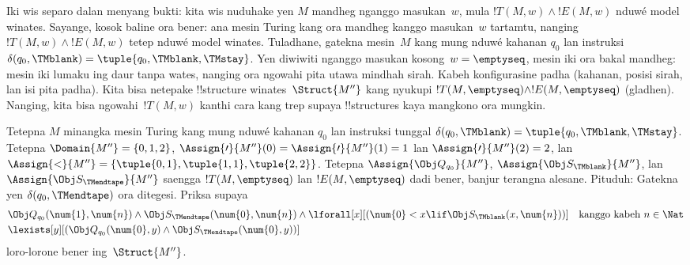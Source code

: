 \documentclass[../../../include/open-logic-section]{subfiles}
\begin{document}
\begin{explain}
  Iki wis separo dalan menyang bukti: kita wis
  nuduhake yen $M$ mandheg nganggo masukan~$w$,
  mula $!T(M,w) \land !E(M,w)$ nduwé model winates.
  Sayange, kosok baline ora bener: ana mesin Turing
  kang ora mandheg kanggo masukan~$w$ tartamtu,
  nanging $!T(M,w) \land !E(M,w)$ tetep nduwé
  model winates. Tuladhane, gatekna mesin~$M$
  kang mung nduwé kahanan $q_0$ lan instruksi
  $\delta(q_0,\TMblank) = \tuple{q_0,\TMblank,\TMstay}$.
  Yen diwiwiti nganggo masukan kosong~$w = \emptyseq$,
  mesin iki ora bakal mandheg: mesin iki lumaku
  ing daur tanpa wates, nanging ora ngowahi pita
  utawa mindhah sirah. Kabeh konfigurasine padha
  (kahanan, posisi sirah, lan isi pita padha).
  Kita bisa netepake !!{structure} winates~$\Struct{M''}$
  kang nyukupi $!T(M,\emptyseq) \land !E(M,\emptyseq)$
  (gladhen). Nanging, kita bisa ngowahi~$!T(M,w)$
  kanthi cara kang trep supaya !!{structure}s
  kaya mangkono ora mungkin.

  \begin{prob}
    Tetepna $M$ minangka mesin Turing kang mung nduwé
    kahanan $q_0$ lan instruksi tunggal
    $\delta(q_0,\TMblank) = \tuple{q_0,\TMblank,\TMstay}$.
    Tetepna $\Domain{M''} = \{0, 1, 2\}$,
    $\Assign{\prime}{M''}(0) =
    \Assign{\prime}{M''}(1) = 1$ lan
    $\Assign{\prime}{M''}(2) = 2$, lan
    $\Assign{<}{M''} = \{\tuple{0,1}, \tuple{1,1}, \tuple{2,2}\}$.
    Tetepna $\Assign{\Obj Q_{q_0}}{M''}$,
    $\Assign{\Obj S_{\TMblank}}{M''}$, lan
    $\Assign{\Obj S_{\TMendtape}}{M''}$ saengga
    $!T(M,\emptyseq)$ lan $!E(M,\emptyseq)$
    dadi bener, banjur terangna alesane. Pituduh:
    Gatekna yen $\delta(q_0, \TMendtape)$ ora ditegesi.
    Priksa supaya
    \begin{align*}
    & \Obj Q_{q_0}(\num{1}, \num{n}) \land \Obj S_{\TMendtape}(\num{0}, \num{n})
      \land 
      \lforall[x][(\num{0} < x \lif \Obj S_\TMblank(x, \num{n}))] \text{\quad kanggo kabeh $n \in \Nat$}\\
    & \lexists[y][(\Obj Q_{q_0}(\num{0}, y) \land \Obj S_{\TMendtape}(\num{0}, y))]
    \end{align*}
    loro-lorone bener ing~$\Struct{M''}$.
  \end{prob}
\end{explain}
\end{document}
